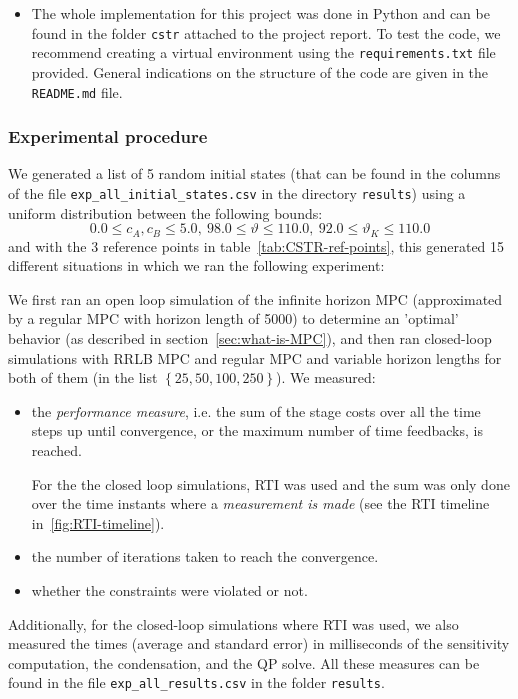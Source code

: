 \documentclass[12pt]{article}
\begin{document}
\begin{itemize}[label=\textbullet]
	\item The whole implementation for this project was done in Python and can be found in the folder \verb|cstr| attached to the project report.
	To test the code, we recommend creating a virtual environment using the \verb|requirements.txt| file provided.
	General indications on the structure of the code are given in the \verb|README.md| file.
\end{itemize}

\subsubsection{Experimental procedure}

We generated a list of 5 random initial states (that can be found in the columns of the file \verb|exp_all_initial_states.csv| in the directory \verb|results|) using a uniform distribution between the following bounds:
$$0.0\leq c_A,c_B\leq 5.0,~98.0\leq\vartheta\leq 110.0,~92.0\leq \vartheta_K\leq 110.0$$
and with the 3 reference points in table~\ref{tab:CSTR-ref-points}, this generated 15 different situations in which we ran the following experiment:

We first ran an open loop simulation of the infinite horizon MPC (approximated by a regular MPC with horizon length of 5000) to determine an 'optimal' behavior (as described in section~\ref{sec:what-is-MPC}), and then ran closed-loop simulations with RRLB MPC and regular MPC and variable horizon lengths for both of them (in the list $\left\{ 25, 50, 100, 250 \right\}$).
We measured:
\begin{itemize}[label=\textbullet]
	\item the \textit{performance measure}, i.e. the sum of the stage costs over all the time steps up until convergence, or the maximum number of time feedbacks, is reached.

	For the the closed loop simulations, RTI was used and the sum was only done over the time instants where a \textit{measurement is made} (see the RTI timeline in~\ref{fig:RTI-timeline}).

	\item the number of iterations taken to reach the convergence.

	\item whether the constraints were violated or not.
\end{itemize}

\noindent Additionally, for the closed-loop simulations where RTI was used, we also measured the times (average and standard error) in milliseconds of the sensitivity computation, the condensation, and the QP solve.
All these measures can be found in the file \verb|exp_all_results.csv| in the folder \verb|results|.
\end{document}
